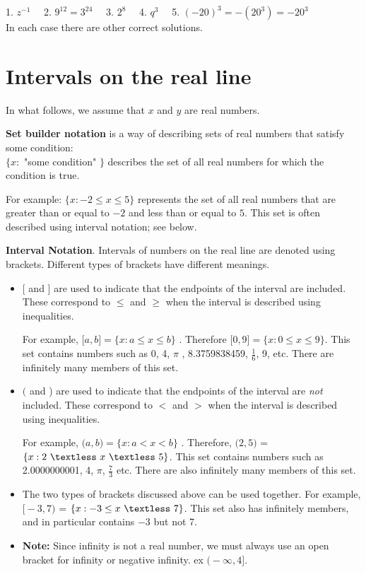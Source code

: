 \documentclass[11pt]{book}               %
\begin{document}
1. $ z^{-1} \quad$ 2. $ 9^{12} = 3^{24}\quad$ 3. $ 2^8\quad $ 4. $ q^3 \quad $ 5. $ (-20)^3 = - (20^3) = -20^3 $\\
In each case there are other correct solutions.

\newpage
\label{section-intervals}
\section{Intervals on the real line}

In what follows, we assume that $x$ and $y$ are real numbers.


\noindent \textbf{Set builder notation} is a way of describing sets of real numbers that satisfy some condition:\\
$\{ x:$ "some condition" $\}$ describes the set of all real numbers for which the condition is true.  

For example:
$ \{ x : -2 \leq x \leq 5 \}$ represents the set of all real numbers that are greater than or equal to $-2$ and less than or equal to $5$.
This set is often described using interval notation; see below.


\noindent \textbf{Interval Notation}.  Intervals of numbers on the real line are denoted using brackets.  Different types of brackets have different meanings.

\begin{itemize}
\item $\big[$ and \big] are used to indicate that the endpoints of the interval are included. These correspond to $\leq$ and $\geq$ when the interval is described using inequalities.

For example, $ \big[ a, b \big] = \{ x: a\leq x\leq b\} $ . Therefore $ \big[ 0, 9 \big] =  \{ x : 0 \leq x \leq 9 \}$.  
This set contains numbers such as 0, 4, $ \pi$ , 8.3759838459, $ \frac{1}{6} $, 9, etc. There are infinitely many members of this set. 



\item $\big($ and \big) are used to indicate that the endpoints of the interval are \emph{not} included. These correspond to $<$ and $>$ when the interval is described using inequalities.

For example, $ \big( a, b \big) = \{ x: a < x < b\} $ .  Therefore,
$ \big( 2, 5 \big) $ = $ \{ x : 2  \ \textless \ x \ \textless\  5 \}$. 
This set contains numbers such as 2.0000000001, 4, $ \pi$, $ \frac{7}{3} $ etc. There are also infinitely many members of this set.


\item The two types of brackets discussed above can be used together. For example,\\
 $ \big[ -3, 7 \big) $ = $ \{ x : -3  \leq x \ \textless \  7 \}$.
This set also has infinitely members, and in particular contains $-3$ but not 7.


\item \textbf{Note:} Since infinity is not a real number, we must always use an open bracket for infinity or negative infinity. ex $ \big ( -\infty , 4 \big ]$.
\end{itemize}
\end{document}
